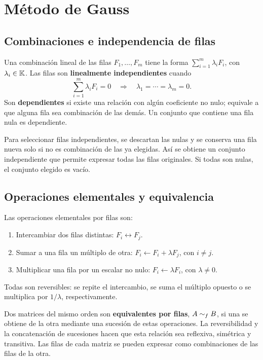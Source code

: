 \section{Método de Gauss}
\label{sec:gauss}

\subsection*{Combinaciones e independencia de filas}

Una combinación lineal de las filas $F_1,\ldots,F_m$ tiene la forma
$\sum_{i=1}^{m}\lambda_iF_i$, con $\lambda_i\in\mathbb{K}$.
Las filas son \textbf{linealmente independientes} cuando
\[
 \sum_{i=1}^{m}\lambda_iF_i=0
 \quad\Longrightarrow\quad \lambda_1=\cdots=\lambda_m=0.
\]
Son \textbf{dependientes} si existe una relación con algún coeficiente
no nulo; equivale a que alguna fila sea combinación de las demás.
Un conjunto que contiene una fila nula es dependiente.

Para seleccionar filas independientes, se descartan las nulas y se conserva
una fila nueva solo si no es combinación de las ya elegidas. Así se obtiene
un conjunto independiente que permite expresar todas las filas originales.
Si todas son nulas, el conjunto elegido es vacío.

\subsection*{Operaciones elementales y equivalencia}
\label{sec:elementales}

\begin{samepage}
Las operaciones elementales por filas son:
\begin{enumerate}
 \item Intercambiar dos filas distintas: $F_i\leftrightarrow F_j$.
 \item Sumar a una fila un múltiplo de otra:
       $F_i\leftarrow F_i+\lambda F_j$, con $i\ne j$.
 \item Multiplicar una fila por un escalar no nulo:
       $F_i\leftarrow\lambda F_i$, con $\lambda\ne0$.
\end{enumerate}
\end{samepage}
Todas son reversibles: se repite el intercambio, se suma el múltiplo
opuesto o se multiplica por $1/\lambda$, respectivamente.

Dos matrices del mismo orden son \textbf{equivalentes por filas}, $A\sim_f B$,
si una se obtiene de la otra mediante una sucesión de estas operaciones.
La reversibilidad y la concatenación de sucesiones hacen que esta relación
sea reflexiva, simétrica y transitiva. Las filas de cada matriz se pueden
expresar como combinaciones de las filas de la otra.

